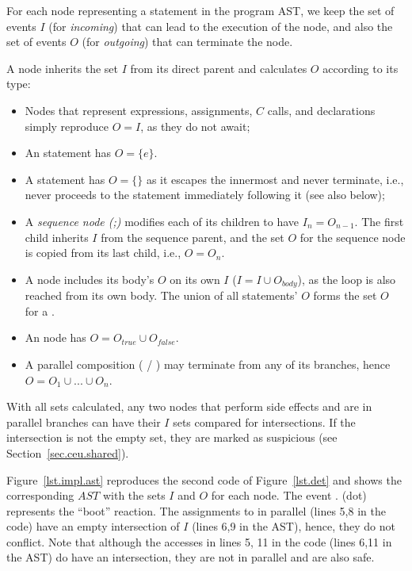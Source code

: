 For each node representing a statement in the program AST, we keep the set of 
events $I$ (for \emph{incoming}) that can lead to the execution of the node, 
and also the set of events $O$ (for \emph{outgoing}) that can terminate the 
node.

A node inherits the set $I$ from its direct parent and calculates $O$ according 
to its type:
%
\begin{itemize}
%
\item Nodes that represent expressions, assignments, $C$ calls, and 
declarations simply reproduce $O=I$, as they do not await;
%
\item An  statement has $O=\{e\}$.
%
\item A  statement has $O=\{\}$ as it escapes the innermost 
 and never terminate, i.e., never proceeds to the statement 
immediately following it (see also  below);
%
\item A \emph{sequence node (;)} modifies each of its children to have 
$I_n=O_{n-1}$.
The first child inherits $I$ from the sequence parent, and the set $O$ for the 
sequence node is copied from its last child, i.e., $O=O_n$.
%
\item A  node includes its body's $O$ on its own $I$ ($I=I \cup 
O_{body}$), as the loop is also reached from its own body.
The union of all  statements' $O$ forms the set $O$ for a 
.
%
\item An  node has $O=O_{true} \cup O_{false}$.
%
\item A parallel composition ( / ) may terminate 
from any of its branches, hence $O = O_1 \cup ... \cup O_n$.
\end{itemize}

With all sets calculated, any two nodes that perform side effects and are in 
parallel branches can have their $I$ sets compared for intersections.
If the intersection is not the empty set, they are marked as suspicious (see 
Section~\ref{sec.ceu.shared}).

Figure~\ref{lst.impl.ast} reproduces the second code of Figure~\ref{lst.det} 
and shows the corresponding $AST$ with the sets $I$ and $O$ for each node.
The event $.$ (dot) represents the ``boot'' reaction.
The assignments to  in parallel (lines 5,8 in the code) have an empty 
intersection of $I$ (lines 6,9 in the AST), hence, they do not conflict.
Note that although the accesses in lines 5, 11 in the code (lines 6,11 in the 
AST) do have an intersection, they are not in parallel and are also safe.

